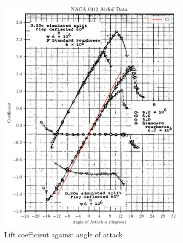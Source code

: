 \documentclass{article}
\begin{document}
\begin{figure}[H]
    \centering
    \captionsetup{justification=centering}
    \begin{subfigure}{0.45\textwidth}
        \includegraphics[width=0.99\textwidth]{figures/NACA0012_lift_validation.png}
        \caption{Lift coefficient against angle of attack}
        \label{fig:0012_lift_validation}
    \end{subfigure}
    \begin{subfigure}{0.45\textwidth}
        \centering

\end{subfigure}
\end{figure}
\end{document}
